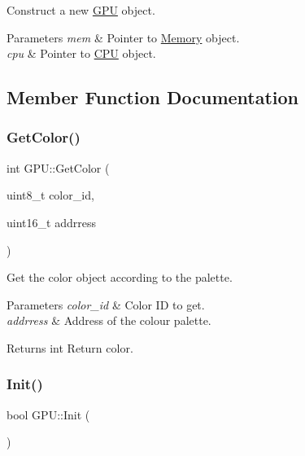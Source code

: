 Construct a new \mbox{\hyperlink{classGPU}{G\+PU}} object. 


\begin{DoxyParams}{Parameters}
{\em mem} & Pointer to \mbox{\hyperlink{classMemory}{Memory}} object. \\
\hline
{\em cpu} & Pointer to \mbox{\hyperlink{classCPU}{C\+PU}} object. \\
\hline
\end{DoxyParams}


\subsection{Member Function Documentation}
\mbox{\label{classGPU_ab71b7ac6de12c201a1d90c05590cb858}} 
\subsubsection{\texorpdfstring{Get\+Color()}{GetColor()}}
{\footnotesize\ttfamily int G\+P\+U\+::\+Get\+Color (\begin{DoxyParamCaption}\item[{uint8\+\_\+t}]{color\+\_\+id,  }\item[{uint16\+\_\+t}]{addrress }\end{DoxyParamCaption})\hspace{0.3cm}{\ttfamily [private]}}



Get the color object according to the palette. 


\begin{DoxyParams}{Parameters}
{\em color\+\_\+id} & Color ID to get. \\
\hline
{\em addrress} & Address of the colour palette. \\
\hline
\end{DoxyParams}
\begin{DoxyReturn}{Returns}
int Return color. 
\end{DoxyReturn}
\mbox{\label{classGPU_a712acb0ed0ea3baf05379b26922d43f7}} 
\subsubsection{\texorpdfstring{Init()}{Init()}}
{\footnotesize\ttfamily bool G\+P\+U\+::\+Init (\begin{DoxyParamCaption}{ }\end{DoxyParamCaption})}



